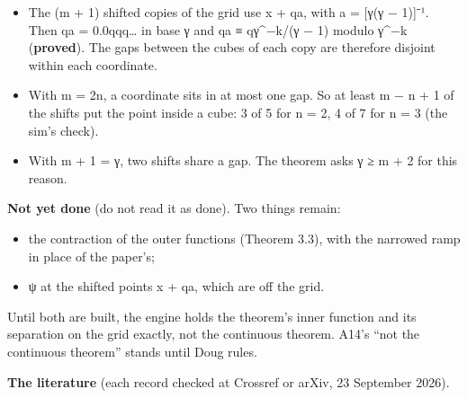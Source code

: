 \begin{enumerate}
\begin{itemize}
\item The (m + 1) shifted copies of the grid use x + qa, with a = [γ(γ − 1)]⁻¹. Then qa = 0.0qqq… in base γ and qa ≡ qγ\textasciicircum{}−k/(γ − 1) modulo γ\textasciicircum{}−k (\textbf{proved}). The gaps between the cubes of each copy are therefore disjoint within each coordinate.
\item With m = 2n, a coordinate sits in at most one gap. So at least m − n + 1 of the shifts put the point inside a cube: 3 of 5 for n = 2, 4 of 7 for n = 3 (the sim's check).
\item With m + 1 = γ, two shifts share a gap. The theorem asks γ ≥ m + 2 for this reason.
\end{itemize}
\end{enumerate}

\textbf{Not yet done} (do not read it as done). Two things remain:

\begin{itemize}
\item the contraction of the outer functions (Theorem 3.3), with the narrowed ramp in place of the paper's;
\item ψ at the shifted points x + qa, which are off the grid.
\end{itemize}

Until both are built, the engine holds the theorem's inner function and its separation on the grid exactly, not the continuous theorem. A14's “not the continuous theorem” stands until Doug rules.

\textbf{The literature} (each record checked at Crossref or arXiv, 23 September 2026).


